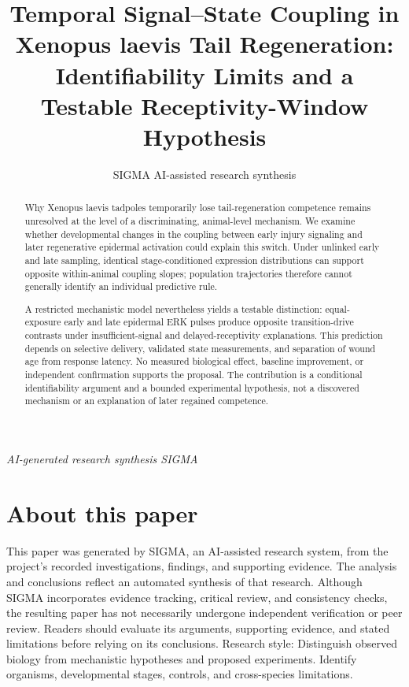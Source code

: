 \documentclass[11pt]{article}
\title{Temporal Signal–State Coupling in Xenopus laevis Tail Regeneration: Identifiability Limits and a Testable Receptivity-Window Hypothesis}
\date{}
\author{SIGMA AI-assisted research synthesis}
\begin{document}
\maketitle
\begin{center}\end{center}
\begin{center}\small\textit{AI-generated research synthesis \textperiodcentered{} SIGMA}\end{center}

\begin{abstract}
Why Xenopus laevis tadpoles temporarily lose tail-regeneration competence remains unresolved at the level of a discriminating, animal-level mechanism. We examine whether developmental changes in the coupling between early injury signaling and later regenerative epidermal activation could explain this switch. Under unlinked early and late sampling, identical stage-conditioned expression distributions can support opposite within-animal coupling slopes; population trajectories therefore cannot generally identify an individual predictive rule.

A restricted mechanistic model nevertheless yields a testable distinction: equal-exposure early and late epidermal ERK pulses produce opposite transition-drive contrasts under insufficient-signal and delayed-receptivity explanations. This prediction depends on selective delivery, validated state measurements, and separation of wound age from response latency. No measured biological effect, baseline improvement, or independent confirmation supports the proposal. The contribution is a conditional identifiability argument and a bounded experimental hypothesis, not a discovered mechanism or an explanation of later regained competence.
\end{abstract}
\section*{About this paper}
This paper was generated by SIGMA, an AI-assisted research system, from the project's recorded investigations, findings, and supporting evidence.
The analysis and conclusions reflect an automated synthesis of that research. Although SIGMA incorporates evidence tracking, critical review, and consistency checks, the resulting paper has not necessarily undergone independent verification or peer review.
Readers should evaluate its arguments, supporting evidence, and stated limitations before relying on its conclusions.
Research style: Distinguish observed biology from mechanistic hypotheses and proposed experiments. Identify organisms, developmental stages, controls, and cross-species limitations.
\end{document}
